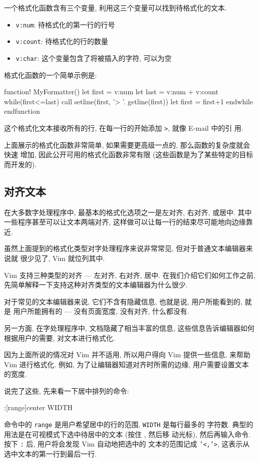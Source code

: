 一个格式化函数含有三个变量, 利用这三个变量可以找到待格式化的文本.
\begin{itemize}
    \item \texttt{v:num}: 待格式化的第一行的行号
    \item \texttt{v:count}: 待格式化的行的数量
    \item \texttt{v:char}: 这个变量包含了将被插入的字符, 可以为空
\end{itemize}

格式化函数的一个简单示例是:
\begin{vimcode}
function! MyFormatter()
   let first = v:num
   let last = v:num + v:count
    while(first<=last)
       call setline(first, '> '. getline(first))
       let first = first+1
    endwhile
endfunction
\end{vimcode}
这个格式化文本接收所有的行, 在每一行的开始添加 \texttt{>}, 就像 E-mail 中的引
用.

上面展示的格式化函数非常简单, 如果需要更高级一点的, 那么函数的复杂度就会快速
增加, 因此公开可用的格式化函数非常有限 (这些函数是为了某些特定的目标而开发的).

\subsection{对齐文本}
\label{subsec:aligning_text}

在大多数字处理程序中, 最基本的格式化选项之一是左对齐, 右对齐, 或居中. 其中
一些程序甚至可以让文本两端对齐, 这样做可以让每一行的结束尽可能地向边缘靠近.

虽然上面提到的格式化类型对字处理程序来说非常常见, 但对于普通文本编辑器来说就
很少见了, Vim 就位列其中.

Vim 支持三种类型的对齐 --- 左对齐, 右对齐, 居中. 在我们介绍它们如何工作之前,
先简单解释一下支持这种对齐类型的文本编辑器为什么很少.

对于常见的文本编辑器来说, 它们不含有隐藏信息, 也就是说, 用户所能看到的, 就是
用户所能拥有的 --- 没有页面宽度, 没有对齐, 什么都没有.

另一方面, 在字处理程序中, 文档隐藏了相当丰富的信息, 这些信息告诉编辑器如何
根据用户的需要, 对文本进行格式化.

因为上面所说的情况对 Vim 并不适用, 所以用户得向 Vim 提供一些信息, 来帮助 Vim
进行格式化. 例如, 为了让编辑器知道对齐时所需的边缘, 用户需要设置文本的宽度.

说完了这些, 先来看一下居中排列的命令:
\begin{vimcode}
:[range]center WIDTH
\end{vimcode}
命令中的 \texttt{range} 是用户希望居中的行的范围, \texttt{WIDTH} 是每行最多的
字符数. 典型的用法是在可视模式下选中待居中的文本 (按住 , 然后移
动光标), 然后再输入命令. 按下 \texttt{:} 后, 用户将会发现 Vim 自动地把选中的
文本的范围记成 \texttt{'<,'>}, 这表示从选中文本的第一行到最后一行.

